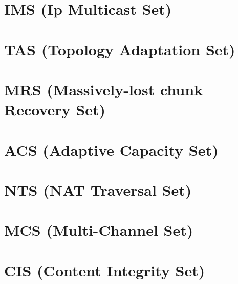 \section{IMS (Ip Multicast Set)}


\section{TAS (Topology Adaptation Set)}


\section{MRS (Massively-lost chunk Recovery Set)}


\section{ACS (Adaptive Capacity Set)}


\section{NTS (NAT Traversal Set)}


\section{MCS (Multi-Channel Set)}


\section{CIS (Content Integrity Set)}


%



